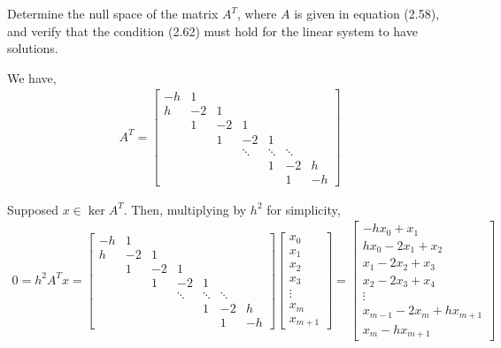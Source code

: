 \documentclass[10pt]{article}
\begin{document}
\begin{problem}
Determine the null space of the matrix \(A^T\), where \(A\) is given in equation (2.58), and verify that the condition (2.62) must hold for the linear system to have solutions.
\end{problem}

\begin{solution}[Solution]

We have,
\begin{align*}
    A^T =
    \left[\begin{array}{rrrrrrr}
        -h & 1 \\
        h & -2 & 1 \\
        & 1 & -2 & 1 \\
        && 1 & -2 & 1 \\
        &&& \ddots & \ddots & \ddots \\
        &&&& 1 & -2 & h \\
        &&&&& 1 & -h
    \end{array}\right]
\end{align*}

Supposed \( x\in\ker A^T \). Then, multiplying by \( h^2 \) for simplicity,
\begin{align*}
    0 = h^2A^Tx = 
    \left[\begin{array}{rrrrrrr}
        -h & 1 \\
        h & -2 & 1 \\
        & 1 & -2 & 1 \\
        && 1 & -2 & 1 \\
        &&& \ddots & \ddots & \ddots \\
        &&&& 1 & -2 & h \\
        &&&&& 1 & -h
    \end{array}\right]
    \left[\begin{array}{r}x_0 \\ x_1 \\ x_2 \\ x_3 \\ \vdots \\ x_m \\ x_{m+1}\end{array}\right]
    =
    \left[\begin{array}{r}
        -hx_0 +x_1 \\ 
        hx_0-2x_1+x_2 \\
        x_1-2x_2+x_3 \\
        x_2-2x_3+x_4 \\
        \vdots \\
        x_{m-1}-2x_m+hx_{m+1} \\
        x_m - hx_{m+1}
    \end{array}\right]
\end{align*}


\end{solution}
\end{document}
